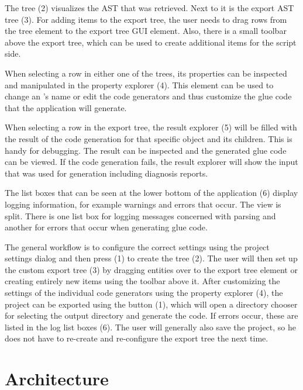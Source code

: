 The  tree (2) visualizes the  AST that was retrieved. Next to it is the export AST tree (3). For adding items to the export tree, the user needs to drag rows from the  tree element to the export tree GUI element. Also, there is a small toolbar above the export tree, which can be used to create additional items for the script side.

When selecting a row in either one of the trees, its properties can be inspected and manipulated in the property explorer (4). This element can be used to change an 's name or edit the code generators and thus customize the glue code that the application will generate. 

When selecting a row in the export tree, the result explorer (5) will be filled with the result of the code generation for that specific object and its children. This is handy for debugging. The result can be inspected and the generated glue code can be viewed. If the code generation fails, the result explorer will show the input that was used for generation including diagnosis reports.

The list boxes that can be seen at the lower bottom of the application (6) display logging information, for example warnings and errors that occur. The view is split. There is one list box for logging messages concerned with  parsing and another for errors that occur when generating glue code.

The general workflow is to configure the correct settings using the project settings dialog and then press  (1) to create the  tree (2). The user will then set up the custom export tree (3) by dragging  entities over to the export tree element or creating entirely new items using the toolbar above it. After customizing the settings of the individual code generators using the property explorer (4), the project can be exported using the  button (1), which will open a directory chooser for selecting the output directory and generate the code. If errors occur, these are listed in the log list boxes (6). The user will generally also save the project, so he does not have to re-create and re-configure the export tree the next time.

\section{Architecture}

